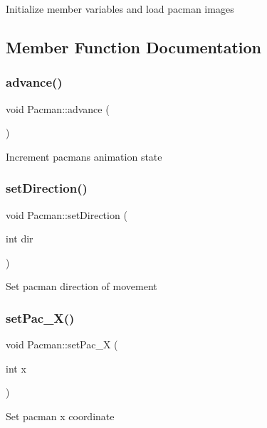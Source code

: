 Initialize member variables and load pacman images 

\subsection{Member Function Documentation}
\mbox{\label{class_pacman_a560007dd011f202daaac68068c527e09}} 
\subsubsection{\texorpdfstring{advance()}{advance()}}
{\footnotesize\ttfamily void Pacman\+::advance (\begin{DoxyParamCaption}{ }\end{DoxyParamCaption})}

Increment pacman\textquotesingle{}s animation state \mbox{\label{class_pacman_a388f4708c08ba930b471237a897f522e}} 
\subsubsection{\texorpdfstring{set\+Direction()}{setDirection()}}
{\footnotesize\ttfamily void Pacman\+::set\+Direction (\begin{DoxyParamCaption}\item[{int}]{dir }\end{DoxyParamCaption})}

Set pacman direction of movement \mbox{\label{class_pacman_a532e817b83bc0315b2ab666b2c90ab1a}} 
\subsubsection{\texorpdfstring{set\+Pac\+\_\+\+X()}{setPac\_X()}}
{\footnotesize\ttfamily void Pacman\+::set\+Pac\+\_\+X (\begin{DoxyParamCaption}\item[{int}]{x }\end{DoxyParamCaption})}

Set pacman x coordinate \mbox{\label{class_pacman_ad8250d3b6e8e9300bfe9ab650edca7e1}} 
